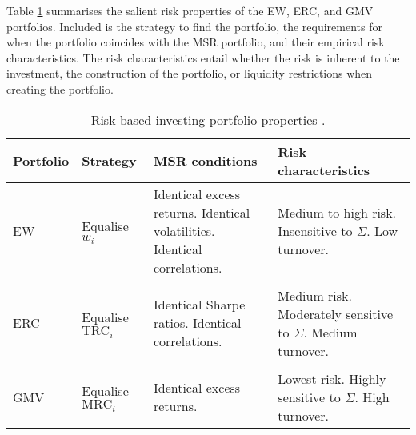\documentclass[
]{article}
\begin{document}
Table \ref{tab_rb_port} summarises the salient risk properties of the EW, ERC, and GMV portfolios. Included is the strategy to find the portfolio, the requirements for when the portfolio coincides with the MSR portfolio, and their empirical risk characteristics. The risk characteristics entail whether the risk is inherent to the investment, the construction of the portfolio, or liquidity restrictions when creating the portfolio.

\begin{table} [h] 
\caption{Risk-based investing portfolio properties \citep{J13}.}
\label{tab_rb_port}
\centering
 \begin{tabular}{p{1.5cm} p{1.9cm} p{3.9cm}  p{4.4cm}  } 
\hline
\textbf{Portfolio} &  \textbf{Strategy} & \textbf{MSR conditions} & \textbf{Risk characteristics}\\ 
 \hline
EW & Equalise $w_i$ & Identical \newline excess returns. \newline Identical volatilities.  \newline Identical correlations. & Medium to high risk. \newline Insensitive to $\Sigma$. \newline Low turnover. \\
&&&\\
ERC & Equalise $\text{TRC}_i$ & Identical \newline Sharpe ratios. \newline Identical correlations. & Medium risk. \newline Moderately sensitive to $\Sigma$. \newline Medium  turnover. \\
&&&\\
GMV & Equalise $\text{MRC}_i$ & Identical \newline excess returns. & Lowest risk. \newline Highly sensitive to $\Sigma$. \newline High turnover.  \\
 \hline
\end{tabular}
\end{table}
\end{document}

